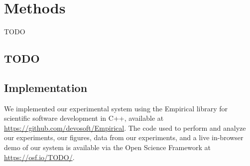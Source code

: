 \section{Methods}

TODO

\subsection{TODO}







\subsection{Implementation}

We implemented our experimental system using the Empirical library for scientific software development in C++, available at \url{https://github.com/devosoft/Empirical}.
The code used to perform and analyze our experiments, our figures, data from our experiments, and a live in-browser demo of our system is available via the Open Science Framework at \url{https://osf.io/TODO/}.
